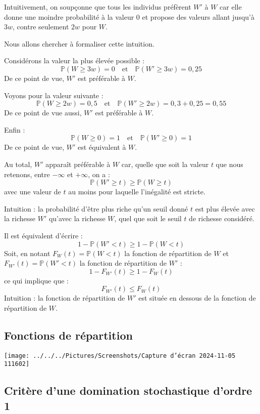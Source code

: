 \documentclass[a4paper, 12pt]{report}
\begin{document}
Intuitivement, on soupçonne que tous les individus préfèrent \( W' \) à \( W \) car elle donne une moindre probabilité à la valeur 0 et propose des valeurs allant jusqu'à \( 3w \), contre seulement \( 2w \) pour \( W \).

Nous allons chercher à formaliser cette intuition.

Considérons la valeur la plus élevée possible :
\[
\mathbb{P}(W \geq 3w) = 0 \quad \text{et} \quad \mathbb{P}(W' \geq 3w) = 0{,}25
\]
De ce point de vue, \( W' \) est préférable à \( W \).

Voyons pour la valeur suivante :
\[
\mathbb{P}(W \geq 2w) = 0{,}5 \quad \text{et} \quad \mathbb{P}(W' \geq 2w) = 0{,}3 + 0{,}25 = 0{,}55
\]
De ce point de vue aussi, \( W' \) est préférable à \( W \).

Enfin :
\[
\mathbb{P}(W \geq 0) = 1 \quad \text{et} \quad \mathbb{P}(W' \geq 0) = 1
\]
De ce point de vue, \( W' \) est équivalent à \( W \).

Au total, \( W' \) apparaît préférable à \( W \) car, quelle que soit la valeur \( t \) que nous retenons, entre \( -\infty \) et \( +\infty \), on a :
\[
\mathbb{P}(W' \geq t) \geq \mathbb{P}(W \geq t)
\]
avec une valeur de \( t \) au moins pour laquelle l'inégalité est stricte.

Intuition : la probabilité d'être plus riche qu'un seuil donné \( t \) est plus élevée avec la richesse \( W' \) qu'avec la richesse \( W \), quel que soit le seuil \( t \) de richesse considéré.

Il est équivalent d'écrire :
\[
1 - \mathbb{P}(W' < t) \geq 1 - \mathbb{P}(W < t)
\]
Soit, en notant \( F_W(t) = \mathbb{P}(W < t) \) la fonction de répartition de \( W \) et \( F_{W'}(t) = \mathbb{P}(W' < t) \) la fonction de répartition de \( W' \) :
\[
1 - F_{W'}(t) \geq 1 - F_W(t)
\]
ce qui implique que :
\[
F_{W'}(t) \leq F_W(t)
\]
Intuition : la fonction de répartition de \( W' \) est située en dessous de la fonction de répartition de \( W \).

\subsection{Fonctions de répartition}

\begin{center}
	\texttt{[image: ../../../Pictures/Screenshots/Capture d'écran 2024-11-05 111602]}
\end{center}

\subsection{Critère d'une domination stochastique d'ordre 1}
\end{document}
